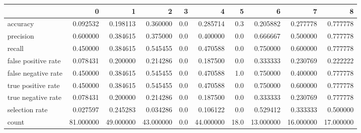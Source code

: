 \begin{tabular}{lrrrrrrrrr}
\toprule
{} &          0 &          1 &          2 &    3 &          4 &     5 &          6 &          7 &          8 \\
\midrule
accuracy            &   0.092532 &   0.198113 &   0.360000 &  0.0 &   0.285714 &   0.3 &   0.205882 &   0.277778 &   0.777778 \\
precision           &   0.600000 &   0.384615 &   0.375000 &  0.0 &   0.400000 &   0.0 &   0.666667 &   0.500000 &   0.777778 \\
recall              &   0.450000 &   0.384615 &   0.545455 &  0.0 &   0.470588 &   0.0 &   0.750000 &   0.600000 &   0.777778 \\
false positive rate &   0.078431 &   0.200000 &   0.214286 &  0.0 &   0.187500 &   0.0 &   0.333333 &   0.230769 &   0.222222 \\
false negative rate &   0.450000 &   0.384615 &   0.545455 &  0.0 &   0.470588 &   1.0 &   0.750000 &   0.400000 &   0.777778 \\
true positive rate  &   0.450000 &   0.384615 &   0.545455 &  0.0 &   0.470588 &   0.0 &   0.750000 &   0.600000 &   0.777778 \\
true negative rate  &   0.078431 &   0.200000 &   0.214286 &  0.0 &   0.187500 &   0.0 &   0.333333 &   0.230769 &   0.777778 \\
selection rate      &   0.027597 &   0.245283 &   0.034286 &  0.0 &   0.106122 &   0.0 &   0.529412 &   0.333333 &   0.500000 \\
count               &  81.000000 &  49.000000 &  43.000000 &  0.0 &  44.000000 &  18.0 &  13.000000 &  16.000000 &  17.000000 \\
\bottomrule
\end{tabular}
